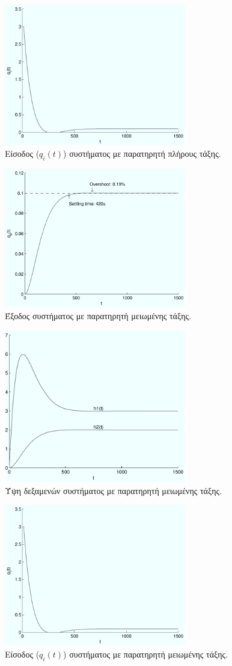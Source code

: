 \documentclass[a4paper, 11pt, english, greek]{article}
\begin{document}
\begin{figure}[htb]
  \centering
  \includegraphics[width=300px]{input_2}
  \caption{Είσοδος ($q_i(t)$) συστήματος με παρατηρητή πλήρους τάξης.}
  \label{fig:input_2}
\end{figure}

\begin{figure}[htb]
  \centering
  \includegraphics[width=300px]{output_3}
  \caption{Έξοδος συστήματος με παρατηρητή μειωμένης τάξης.}
  \label{fig:output_3}
\end{figure}

\begin{figure}[htb]
  \centering
  \includegraphics[width=300px]{heights_3}
  \caption{Ύψη δεξαμενών συστήματος με παρατηρητή μειωμένης τάξης.}
  \label{fig:heights_3}
\end{figure}

\begin{figure}[htb]
  \centering
  \includegraphics[width=300px]{input_3}
  \caption{Είσοδος ($q_i(t)$) συστήματος με παρατηρητή μειωμένης τάξης.}
  \label{fig:input_3}
\end{figure}
\end{document}
